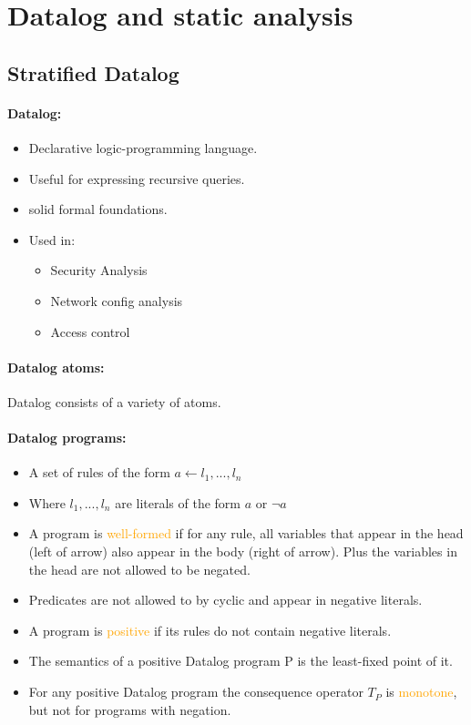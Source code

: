 \section{Datalog and static analysis}

\subsection{Stratified Datalog}

\paragraph{Datalog:}
\begin{itemize}
    \item Declarative logic-programming language.
    \item Useful for expressing recursive queries.
    \item solid formal foundations.
    \item Used in:
    \begin{itemize}
        \item Security Analysis
        \item Network config analysis
        \item Access control
    \end{itemize}{}
\end{itemize}

\paragraph{Datalog atoms:} Datalog consists of a variety of atoms.

\begin{minipage}{0.5\linewidth}
    \centering      
    \def\svgwidth{\linewidth}
        
\end{minipage}  
\paragraph{Datalog programs:} 
\begin{itemize}
    \item A set of rules of the form $a \xleftarrow{} l_1,...,l_n$
    \item Where $l_1,...,l_n$ are literals of the form $a$ or $\neg a$
    \item A program is \textcolor{orange}{well-formed} if for any rule, all variables that appear in the head (left of arrow) also appear in the body (right of arrow). Plus the variables in the head are not allowed to be negated.
    \item Predicates are not allowed to by cyclic and appear in negative literals.
    \item A program is \textcolor{orange}{positive} if its rules do not contain negative literals.
    \item The semantics of a positive Datalog program P is the least-fixed point of it.
    \item For any positive Datalog program the consequence operator $T_P$ is \textcolor{orange}{monotone}, but not for programs with negation.
\end{itemize}{}

